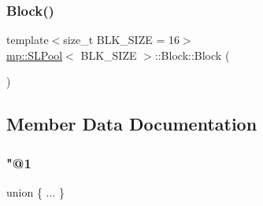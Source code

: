 \subsubsection{\texorpdfstring{Block()}{Block()}}
{\footnotesize\ttfamily template$<$size\+\_\+t B\+L\+K\+\_\+\+S\+I\+ZE = 16$>$ \\
\hyperlink{classmp_1_1_s_l_pool}{mp\+::\+S\+L\+Pool}$<$ B\+L\+K\+\_\+\+S\+I\+ZE $>$\+::Block\+::\+Block (\begin{DoxyParamCaption}{ }\end{DoxyParamCaption})\hspace{0.3cm}{\ttfamily [inline]}}



\subsection{Member Data Documentation}
\mbox{\label{structmp_1_1_s_l_pool_1_1_block_a16dc0abe30900180b814ba2212a6ea9c}} 
\subsubsection{\texorpdfstring{"@1}{@1}}
{\footnotesize\ttfamily union \{ ... \} }

